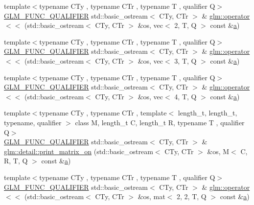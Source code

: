 \begin{DoxyCompactItemize}
\item 
{\footnotesize template$<$typename C\+Ty , typename C\+Tr , typename T , qualifier Q$>$ }\\\hyperlink{setup_8hpp_a33fdea6f91c5f834105f7415e2a64407}{G\+L\+M\+\_\+\+F\+U\+N\+C\+\_\+\+Q\+U\+A\+L\+I\+F\+I\+ER} std\+::basic\+\_\+ostream$<$ C\+Ty, C\+Tr $>$ \& \hyperlink{group__gtx__io_ga164ed8df8315066e091df1987617f188}{glm\+::operator$<$$<$} (std\+::basic\+\_\+ostream$<$ C\+Ty, C\+Tr $>$ \&os, vec$<$ 2, T, Q $>$ const \&\hyperlink{_s_d_l__opengl__glext_8h_a3309789fc188587d666cda5ece79cf82}{a})
\item 
{\footnotesize template$<$typename C\+Ty , typename C\+Tr , typename T , qualifier Q$>$ }\\\hyperlink{setup_8hpp_a33fdea6f91c5f834105f7415e2a64407}{G\+L\+M\+\_\+\+F\+U\+N\+C\+\_\+\+Q\+U\+A\+L\+I\+F\+I\+ER} std\+::basic\+\_\+ostream$<$ C\+Ty, C\+Tr $>$ \& \hyperlink{group__gtx__io_ga367fccf3eb4c54a7624e628b6131e76d}{glm\+::operator$<$$<$} (std\+::basic\+\_\+ostream$<$ C\+Ty, C\+Tr $>$ \&os, vec$<$ 3, T, Q $>$ const \&\hyperlink{_s_d_l__opengl__glext_8h_a3309789fc188587d666cda5ece79cf82}{a})
\item 
{\footnotesize template$<$typename C\+Ty , typename C\+Tr , typename T , qualifier Q$>$ }\\\hyperlink{setup_8hpp_a33fdea6f91c5f834105f7415e2a64407}{G\+L\+M\+\_\+\+F\+U\+N\+C\+\_\+\+Q\+U\+A\+L\+I\+F\+I\+ER} std\+::basic\+\_\+ostream$<$ C\+Ty, C\+Tr $>$ \& \hyperlink{group__gtx__io_ga6ce60b96203d549182f4df029007fb94}{glm\+::operator$<$$<$} (std\+::basic\+\_\+ostream$<$ C\+Ty, C\+Tr $>$ \&os, vec$<$ 4, T, Q $>$ const \&\hyperlink{_s_d_l__opengl__glext_8h_a3309789fc188587d666cda5ece79cf82}{a})
\item 
{\footnotesize template$<$typename C\+Ty , typename C\+Tr , template$<$ length\+\_\+t, length\+\_\+t, typename, qualifier $>$ class M, length\+\_\+t C, length\+\_\+t R, typename T , qualifier Q$>$ }\\\hyperlink{setup_8hpp_a33fdea6f91c5f834105f7415e2a64407}{G\+L\+M\+\_\+\+F\+U\+N\+C\+\_\+\+Q\+U\+A\+L\+I\+F\+I\+ER} std\+::basic\+\_\+ostream$<$ C\+Ty, C\+Tr $>$ \& \hyperlink{namespaceglm_1_1detail_a45b170ea667900227c6849ad1dfe1bf5}{glm\+::detail\+::print\+\_\+matrix\+\_\+on} (std\+::basic\+\_\+ostream$<$ C\+Ty, C\+Tr $>$ \&os, M$<$ C, R, T, Q $>$ const \&\hyperlink{_s_d_l__opengl__glext_8h_a3309789fc188587d666cda5ece79cf82}{a})
\item 
{\footnotesize template$<$typename C\+Ty , typename C\+Tr , typename T , qualifier Q$>$ }\\\hyperlink{setup_8hpp_a33fdea6f91c5f834105f7415e2a64407}{G\+L\+M\+\_\+\+F\+U\+N\+C\+\_\+\+Q\+U\+A\+L\+I\+F\+I\+ER} std\+::basic\+\_\+ostream$<$ C\+Ty, C\+Tr $>$ \& \hyperlink{group__gtx__io_ga9793fc7111cd7d145c369827071f5091}{glm\+::operator$<$$<$} (std\+::basic\+\_\+ostream$<$ C\+Ty, C\+Tr $>$ \&os, mat$<$ 2, 2, T, Q $>$ const \&\hyperlink{_s_d_l__opengl__glext_8h_a3309789fc188587d666cda5ece79cf82}{a})

\end{DoxyCompactItemize}
